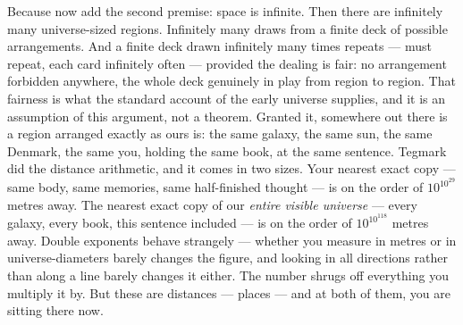 \documentclass[fontsize=11pt,paper=a4,pagesize=auto,parskip=half-]{scrbook}
\begin{document}
Because now add the second premise: space is infinite. Then there are infinitely many universe-sized regions. Infinitely many draws from a finite deck of possible arrangements. And a finite deck drawn infinitely many times repeats --- must repeat, each card infinitely often --- provided the dealing is fair: no arrangement forbidden anywhere, the whole deck genuinely in play from region to region. That fairness is what the standard account of the early universe supplies, and it is an assumption of this argument, not a theorem. Granted it, somewhere out there is a region arranged exactly as ours is: the same galaxy, the same sun, the same Denmark, the same you, holding the same book, at the same sentence. Tegmark did the distance arithmetic, and it comes in two sizes. Your nearest exact copy --- same body, same memories, same half-finished thought --- is on the order of $10^{10^{29}}$ metres away. The nearest exact copy of our \emph{entire visible universe} --- every galaxy, every book, this sentence included --- is on the order of $10^{10^{118}}$ metres away. Double exponents behave strangely --- whether you measure in metres or in universe-diameters barely changes the figure, and looking in all directions rather than along a line barely changes it either. The number shrugs off everything you multiply it by. But these are distances --- places --- and at both of them, you are sitting there now.
\end{document}
